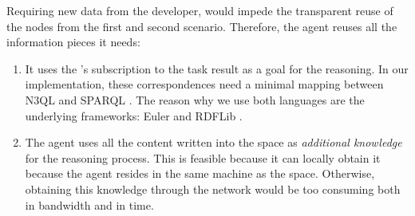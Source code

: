 Requiring new data from the developer, would impede the transparent reuse of the nodes from the first and second scenario.
Therefore, the agent reuses all the information pieces it needs:
\begin{enumerate}
  \item It uses the \noded{}'s subscription to the task result as a goal for the reasoning.
	In our implementation, these correspondences need a minimal mapping between N3QL  and SPARQL .
	The reason why we use both languages are the underlying frameworks: Euler  and RDFLib . %
  \item The agent uses all the content written into the space as \emph{additional knowledge} for the reasoning process.
	This is feasible because it can locally obtain it because the agent resides in the same machine as the space.
	Otherwise, obtaining this knowledge through the network would be too consuming both in bandwidth and in time.
\end{enumerate}